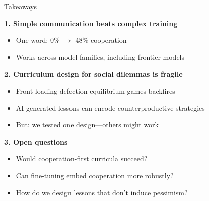 \documentclass[aspectratio=169]{beamer}
\begin{document}
\begin{frame}{Takeaways}
  
  \textbf{1. Simple communication beats complex training}
  \begin{itemize}
    \item One word: 0\% $\to$ 48\% cooperation
    \item Works across model families, including frontier models
  \end{itemize}
  
  \vspace{0.8em}
  \textbf{2. Curriculum design for social dilemmas is fragile}
  \begin{itemize}
    \item Front-loading defection-equilibrium games backfires
    \item AI-generated lessons can encode counterproductive strategies
    \item But: we tested one design---others might work
  \end{itemize}
  
  \vspace{0.8em}
  \textbf{3. Open questions}
  \begin{itemize}
    \item Would cooperation-first curricula succeed?
    \item Can fine-tuning embed cooperation more robustly?
    \item How do we design lessons that don't induce pessimism?
  \end{itemize}

\end{frame}
\end{document}
